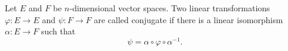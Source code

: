 Let $E$ and $F$ be $n$-dimensional vector spaces. Two linear transformations $\varphi: E \rightarrow E$ and $\psi: F \rightarrow F$ are called conjugate if there is a linear isomorphism $\alpha: E \rightarrow F$ such that
$$\psi = \alpha \circ \varphi \circ \alpha^{-1}.$$
